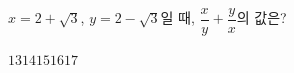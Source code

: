 $x=2+\sqrt{3}$, $y=2-\sqrt{3}$일 때, $\dfrac{x}{y}+\dfrac{y}{x}$의 값은?
\begin{choices32}{$13$}{$14$}{$15$}{$16$}{$17$}\end{choices32}
